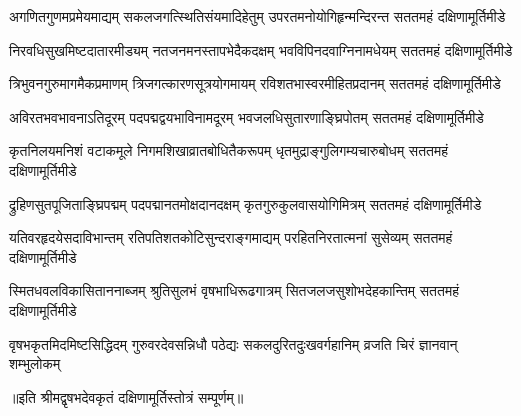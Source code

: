 
\fourlineindentedshloka
{अगणितगुणमप्रमेयमाद्यम्}
{सकलजगत्स्थितिसंयमादिहेतुम्}
{उपरतमनोयोगिहृन्मन्दिरन्त}
{सततमहं दक्षिणामूर्तिमीडे}

\fourlineindentedshloka
{निरवधिसुखमिष्टदातारमीड्यम्}
{नतजनमनस्तापभेदैकदक्षम्}
{भवविपिनदवाग्निनामधेयम्}
{सततमहं दक्षिणामूर्तिमीडे}

\fourlineindentedshloka
{त्रिभुवनगुरुमागमैकप्रमाणम्}
{त्रिजगत्कारणसूत्रयोगमायम्}
{रविशतभास्वरमीहितप्रदानम्}
{सततमहं दक्षिणामूर्तिमीडे}

\fourlineindentedshloka
{अविरतभवभावनाऽतिदूरम्}
{पदपद्मद्वयभाविनामदूरम्}
{भवजलधिसुतारणाङ्घ्रिपोतम्}
{सततमहं दक्षिणामूर्तिमीडे}

\fourlineindentedshloka
{कृतनिलयमनिशं वटाकमूले}
{निगमशिखाव्रातबोधितैकरूपम्}
{धृतमुद्राङ्गुलिगम्यचारुबोधम्}
{सततमहं दक्षिणामूर्तिमीडे}

\fourlineindentedshloka
{द्रुहिणसुतपूजिताङ्घ्रिपद्मम्}
{पदपद्मानतमोक्षदानदक्षम्}
{कृतगुरुकुलवासयोगिमित्रम्}
{सततमहं दक्षिणामूर्तिमीडे}

\fourlineindentedshloka
{यतिवरहृदयेसदाविभान्तम्}
{रतिपतिशतकोटिसुन्दराङ्गमाद्यम्}
{परहितनिरतात्मनां सुसेव्यम्}
{सततमहं दक्षिणामूर्तिमीडे}

\fourlineindentedshloka
{स्मितधवलविकासिताननाब्जम्}
{श्रुतिसुलभं वृषभाधिरूढगात्रम्}
{सितजलजसुशोभदेहकान्तिम्}
{सततमहं दक्षिणामूर्तिमीडे}

\fourlineindentedshloka
{वृषभकृतमिदमिष्टसिद्धिदम्}
{गुरुवरदेवसन्निधौ पठेद्यः}
{सकलदुरितदुःखवर्गहानिम्}
{व्रजति चिरं ज्ञानवान् शम्भुलोकम्}

॥इति श्रीमद्वृषभदेवकृतं दक्षिणामूर्तिस्तोत्रं सम्पूर्णम्॥